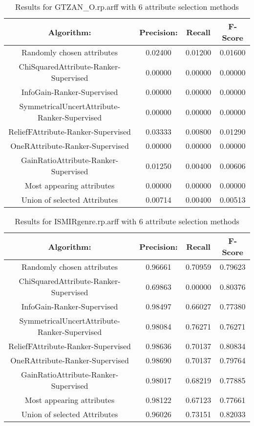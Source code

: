 \begin{table}[p]
\begin{center}
\begin{tabular}{|c|c|c|c|}
\hline Algorithm: & Precision: & Recall & F-Score\\
\hline Randomly chosen attributes & 0.02400 & 0.01200 & 0.01600\\
\hline ChiSquaredAttribute-Ranker-Supervised & 0.00000 & 0.00000 & 0.00000\\
\hline InfoGain-Ranker-Supervised & 0.00000 & 0.00000 & 0.00000\\
\hline SymmetricalUncertAttribute-Ranker-Supervised & 0.00000 & 0.00000 &
0.00000\\
\hline ReliefFAttribute-Ranker-Supervised & 0.03333 & 0.00800 & 0.01290\\
\hline OneRAttribute-Ranker-Supervised & 0.00000 & 0.00000 & 0.00000\\
\hline GainRatioAttribute-Ranker-Supervised & 0.01250 & 0.00400 & 0.00606\\
\hline Most appearing attributes & 0.00000 & 0.00000 & 0.00000\\
\hline Union of selected Attributes & 0.00714 & 0.00400 & 0.00513\\

\hline
\end{tabular}
\caption{Results for GTZAN\_O.rp.arff with 6 attribute selection methods}
\label{table:classifier:GTZAN\_O6}
\end{center}
\end{table}



\begin{table}[p]
\begin{center}
\begin{tabular}{|c|c|c|c|}
\hline Algorithm: & Precision: & Recall & F-Score\\
\hline Randomly chosen attributes & 0.96661 & 0.70959 & 0.79623\\
\hline ChiSquaredAttribute-Ranker-Supervised & 0.69863 & 0.00000 & 0.80376\\
\hline InfoGain-Ranker-Supervised & 0.98497 & 0.66027 & 0.77380\\
\hline SymmetricalUncertAttribute-Ranker-Supervised & 0.98084 & 0.76271 &
0.76271\\
\hline ReliefFAttribute-Ranker-Supervised & 0.98636 & 0.70137 & 0.80834\\
\hline OneRAttribute-Ranker-Supervised & 0.98690 & 0.70137 & 0.79764\\
\hline GainRatioAttribute-Ranker-Supervised & 0.98017 & 0.68219 & 0.77885\\
\hline Most appearing attributes & 0.98122 & 0.67123 & 0.77661\\
\hline Union of selected Attributes & 0.96026 & 0.73151 & 0.82033\\

\hline
\end{tabular}
\caption{Results for ISMIRgenre.rp.arff with 6 attribute selection methods}
\label{table:classifier:ISMIRgenre6}
\end{center}
\end{table}



